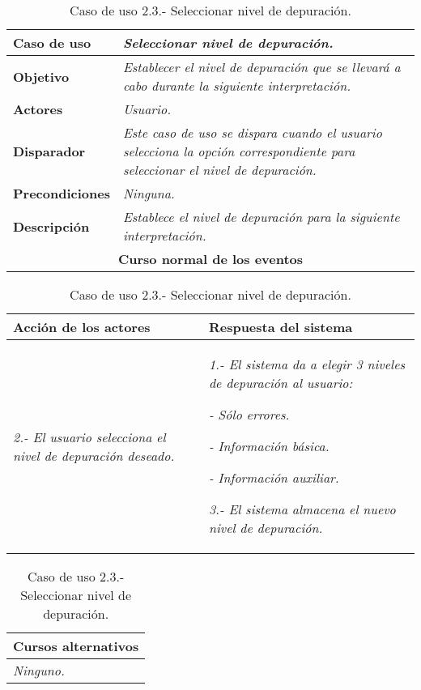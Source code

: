 \documentclass[twoside,a4paper,11pt]{book}
\begin{document}
\begin{table}[!ht]
    \centering
    \begin{tabular}{|p{4cm}|p{11.5cm}|}
    \hline

    \textbf{Caso de uso} & \textit{Seleccionar nivel de depuración.}\\
    \hline

    \textbf{Objetivo} & \textit{Establecer el nivel de depuración que se llevará a cabo durante la siguiente interpretación.}\\
    \hline

    \textbf{Actores} & \textit{Usuario.}\\
    \hline

    \textbf{Disparador} & \textit{Este caso de uso se dispara cuando el usuario selecciona la opción correspondiente para seleccionar el nivel de
				  depuración.}\\
    \hline

    \textbf{Precondiciones} & \textit{Ninguna.}\\
    \hline

    \textbf{Descripción} & \textit{Establece el nivel de depuración para la siguiente interpretación.}\\
    \hline

    \multicolumn{2}{|c|}{\textbf{Curso normal de los eventos}}\\
    \hline

    \end{tabular}
    \begin{tabular}{|p{7.75cm}|p{7.75cm}|}
    \hspace{2cm}\textbf{Acción de los actores} & \hspace{1.75cm}\textbf{Respuesta del sistema}\\
    \hline

    \textit{2.- El usuario selecciona el nivel de depuración deseado.}
    &
    \textit{1.- El sistema da a elegir 3 niveles de depuración al usuario:}

    \textit{  - Sólo errores.}

    \textit{  - Información básica.}

    \textit{  - Información auxiliar.}

    \textit{3.- El sistema almacena el nuevo nivel de depuración.}
    \\
    \hline
    \end{tabular}

    \begin{tabular}{|p{15.9cm}|}
      \hspace{6cm}\textbf{Cursos alternativos}\\
      \hline     
	\textit{Ninguno.}
      \\
      \hline
    \end{tabular}
    \caption{Caso de uso 2.3.- Seleccionar nivel de depuración.}
\end{table}
\end{document}
